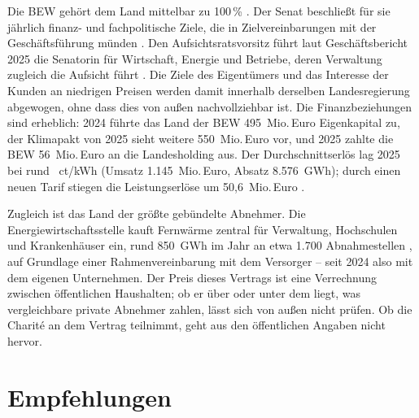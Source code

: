 \documentclass[11pt,DIV=13,a4paper,parskip=half,abstract=true,ngerman]{scrartcl}
\begin{document}
Die BEW gehört dem Land mittelbar zu 100\,\% \parencite{senfin2025unternehmen}.
Der Senat beschließt für sie jährlich finanz- und fachpolitische Ziele, die in Zielvereinbarungen mit der Geschäftsführung münden \parencite{senat2024beteiligungsgrundsaetze,senfin2025beteiligung}.
Den Aufsichtsratsvorsitz führt laut Geschäftsbericht 2025 die Senatorin für Wirtschaft, Energie und Betriebe, deren Verwaltung zugleich die Aufsicht führt \parencite{bew2026gb}.
Die Ziele des Eigentümers und das Interesse der Kunden an niedrigen Preisen werden damit innerhalb derselben Landesregierung abgewogen, ohne dass dies von außen nachvollziehbar ist.
Die Finanzbeziehungen sind erheblich: 2024 führte das Land der BEW 495~Mio.\,Euro Eigenkapital zu, der Klimapakt von 2025 sieht weitere 550~Mio.\,Euro vor, und 2025 zahlte die BEW 56~Mio.\,Euro an die Landesholding aus.
Der Durchschnittserlös lag 2025 bei rund ~ct/kWh (Umsatz 1.145~Mio.\,Euro, Absatz 8.576~GWh); durch einen neuen Tarif stiegen die Leistungserlöse um 50,6~Mio.\,Euro \parencite{bew2026gb}.

Zugleich ist das Land der größte gebündelte Abnehmer.
Die Energiewirtschaftsstelle kauft Fernwärme zentral für Verwaltung, Hochschulen und Krankenhäuser ein, rund 850~GWh im Jahr an etwa 1.700 Abnahmestellen \parencite{ews}, auf Grundlage einer Rahmenvereinbarung mit dem Versorger \parencite{agh2023s1917214} -- seit 2024 also mit dem eigenen Unternehmen.
Der Preis dieses Vertrags ist eine Verrechnung zwischen öffentlichen Haushalten; ob er über oder unter dem liegt, was vergleichbare private Abnehmer zahlen, lässt sich von außen nicht prüfen.
Ob die Charité an dem Vertrag teilnimmt, geht aus den öffentlichen Angaben nicht hervor.

\section{Empfehlungen}\label{sec:empfehlungen}
\end{document}
